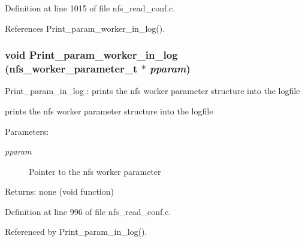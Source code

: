 Definition at line 1015 of file nfs\_\-read\_\-conf.c.

References Print\_\-param\_\-worker\_\-in\_\-log().
\subsubsection{\setlength{\rightskip}{0pt plus 5cm}void Print\_\-param\_\-worker\_\-in\_\-log (nfs\_\-worker\_\-parameter\_\-t $\ast$ {\em pparam})}\label{nfs__read__conf_8c_a10}


Print\_\-param\_\-in\_\-log : prints the nfs worker parameter structure into the logfile

prints the nfs worker parameter structure into the logfile

\begin{Desc}
\item[Parameters:]
\begin{description}
\item[{\em pparam}]Pointer to the nfs worker parameter\end{description}
\end{Desc}
\begin{Desc}
\item[Returns:]none (void function) \end{Desc}


Definition at line 996 of file nfs\_\-read\_\-conf.c.

Referenced by Print\_\-param\_\-in\_\-log().